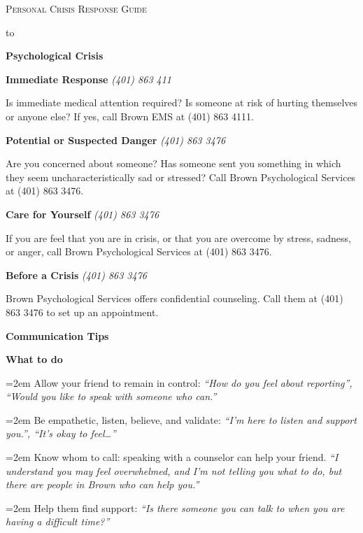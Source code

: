\documentclass[letterpaper,10pt]{report}
\def\headline#1{\hbox to \hsize{\hrulefill\quad\lower.3em\hbox{#1}\quad\hrulefill}}
\newcommand{\tosay}[1]{\textit{#1}}
\newcommand{\situation}[4]{

\parbox{\columnwidth}{
\textbf{#1} \hspace{\fill} \textit{#2} 


#3 \ifthenelse{\isempty{#4}}{}{\\ \tosay{#4}}
\vspace{6pt}}}
\newcommand{\tip}[1]{

\hangindent=2em\hangafter=1 
#1}
\newcommand{\type}[1]{\parbox{\columnwidth}{\large\textbf{#1}}}
\begin{document}
\pagestyle{fancy}
\fancyhf{} %
\renewcommand{\headrulewidth}{0pt}
\renewcommand{\dateseparator}{-}
\yyyymmdddate
{}
\rfoot{\fancyplain{}{\color{mygray} \today}}



\setlength{\columnsep}{0.5in}

\begin{center}
\textsc{\huge\centering Personal Crisis Response Guide}  
\end{center}

\headline{\textit{how to support a friend}}

\vfill

\begin{multicols}{2}
\begin{spacing}{1.15}
\type{Psychological Crisis}

\situation{Immediate Response}{(401) 863 411}{Is immediate medical attention required? Is someone at risk of hurting themselves or anyone else? If yes, call Brown EMS at (401) 863 4111.}{}

\situation{Potential or Suspected Danger}{(401) 863 3476} {Are you concerned about someone? Has someone sent you something in which they seem uncharacteristically sad or stressed? Call Brown Psychological Services at (401) 863 3476.}{}

\situation{Care for Yourself}{(401) 863 3476} { If you are feel that you are in crisis, or that you are overcome by stress, sadness, or anger, call Brown Psychological Services at (401) 863 3476.}{}

\situation{Before a Crisis}{(401) 863 3476} {Brown Psychological Services offers confidential counseling. Call them at (401) 863 3476 to set up an appointment.}{}

\type{Communication Tips}

\situation {What to do} {} {
  \tip{Allow your friend to remain in control: \tosay{``How do you feel about reporting'', ``Would you like to speak with someone who can.''}}
  \tip{Be empathetic, listen, believe, and validate: \tosay{``I'm here to listen and support you.'', ``It's okay to feel\ldots''}}
  \tip{Know whom to call: speaking with a counselor can help your friend. \tosay{``I understand you may feel overwhelmed, and I'm not telling you what to do, but there are people in Brown who can help you.''}}
  \tip{Help them find support: \tosay{``Is there someone you can talk to when you are having a difficult time?''}}
}{}



\end{spacing}
\end{multicols}
\end{document}

